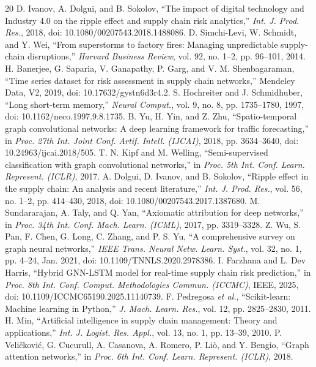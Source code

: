 \documentclass[conference]{IEEEtran}
\begin{document}
\begin{thebibliography}{20}
 D. Ivanov, A. Dolgui, and B. Sokolov, ``The impact of digital technology and Industry 4.0 on the ripple effect and supply chain risk analytics,'' \emph{Int. J. Prod. Res.}, 2018, doi: 10.1080/00207543.2018.1488086.
 D. Simchi-Levi, W. Schmidt, and Y. Wei, ``From superstorms to factory fires: Managing unpredictable supply-chain disruptions,'' \emph{Harvard Business Review}, vol. 92, no. 1--2, pp. 96--101, 2014.
 H. Banerjee, G. Saparia, V. Ganapathy, P. Garg, and V. M. Shenbagaraman, ``Time series dataset for risk assessment in supply chain networks,'' Mendeley Data, V2, 2019, doi: 10.17632/gystn6d3r4.2.
 S. Hochreiter and J. Schmidhuber, ``Long short-term memory,'' \emph{Neural Comput.}, vol. 9, no. 8, pp. 1735--1780, 1997, doi: 10.1162/neco.1997.9.8.1735.
 B. Yu, H. Yin, and Z. Zhu, ``Spatio-temporal graph convolutional networks: A deep learning framework for traffic forecasting,'' in \emph{Proc. 27th Int. Joint Conf. Artif. Intell. (IJCAI)}, 2018, pp. 3634--3640, doi: 10.24963/ijcai.2018/505.
 T. N. Kipf and M. Welling, ``Semi-supervised classification with graph convolutional networks,'' in \emph{Proc. 5th Int. Conf. Learn. Represent. (ICLR)}, 2017.
 A. Dolgui, D. Ivanov, and B. Sokolov, ``Ripple effect in the supply chain: An analysis and recent literature,'' \emph{Int. J. Prod. Res.}, vol. 56, no. 1--2, pp. 414--430, 2018, doi: 10.1080/00207543.2017.1387680.
 M. Sundararajan, A. Taly, and Q. Yan, ``Axiomatic attribution for deep networks,'' in \emph{Proc. 34th Int. Conf. Mach. Learn. (ICML)}, 2017, pp. 3319--3328.
 Z. Wu, S. Pan, F. Chen, G. Long, C. Zhang, and P. S. Yu, ``A comprehensive survey on graph neural networks,'' \emph{IEEE Trans. Neural Netw. Learn. Syst.}, vol. 32, no. 1, pp. 4--24, Jan. 2021, doi: 10.1109/TNNLS.2020.2978386.
 I. Farzhana and L. Dev Harris, ``Hybrid GNN-LSTM model for real-time supply chain risk prediction,'' in \emph{Proc. 8th Int. Conf. Comput. Methodologies Commun. (ICCMC)}, IEEE, 2025, doi: 10.1109/ICCMC65190.2025.11140739.
 F. Pedregosa \emph{et al.}, ``Scikit-learn: Machine learning in Python,'' \emph{J. Mach. Learn. Res.}, vol. 12, pp. 2825--2830, 2011.
 H. Min, ``Artificial intelligence in supply chain management: Theory and applications,'' \emph{Int. J. Logist. Res. Appl.}, vol. 13, no. 1, pp. 13--39, 2010.
 P. Veli\v{c}kovi\'c, G. Cucurull, A. Casanova, A. Romero, P. Li\`o, and Y. Bengio, ``Graph attention networks,'' in \emph{Proc. 6th Int. Conf. Learn. Represent. (ICLR)}, 2018.

\end{thebibliography}
\end{document}
